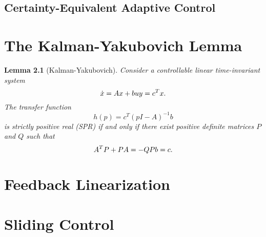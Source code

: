 \documentclass[
]{book}
\newtheorem{lemma}{Lemma}[chapter]
\theoremstyle{definition}
\theoremstyle{definition}
\theoremstyle{definition}
\theoremstyle{definition}
\theoremstyle{remark}
\begin{document}
\hypertarget{certainty-equivalent-adaptive-control}{%
\section{Certainty-Equivalent Adaptive Control}\label{certainty-equivalent-adaptive-control}}

\hypertarget{appendix-appendix}{%
\appendix}


\hypertarget{the-kalman-yakubovich-lemma}{%
\chapter{The Kalman-Yakubovich Lemma}\label{the-kalman-yakubovich-lemma}}

\begin{lemma}[Kalman-Yakubovich]
\protect\hypertarget{lem:KalmanYakubovich}{}\label{lem:KalmanYakubovich}Consider a controllable linear time-invariant system
\[
\dot{x} = A x + b u \\
y = c^T x.
\]
The transfer function
\[
h(p) = c^T (p I - A)^{-1} b 
\]
is strictly positive real (SPR) if and only if there exist positive definite matrices \(P\) and \(Q\) such that
\[
A^T P + P A = - Q \\
Pb = c.
\]
\end{lemma}

\hypertarget{feedbacklinearization}{%
\chapter{Feedback Linearization}\label{feedbacklinearization}}

\hypertarget{slidingcontrol}{%
\chapter{Sliding Control}\label{slidingcontrol}}

  
\end{document}
